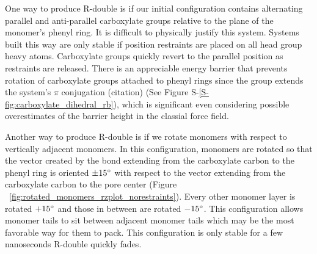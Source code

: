 \documentclass[journal=jpcbfk,manuscript=article]{achemso}
\begin{document}
  One way to produce R-double is if our initial configuration contains
  alternating parallel and anti-parallel carboxylate groups relative to the plane
  of the monomer's phenyl ring.  It is difficult to physically justify this
  system. Systems built this way are only stable if position restraints are
  placed on all head group heavy atoms.  Carboxylate groups quickly revert to the
  parallel position as restraints are released. There is an appreciable energy
  barrier that prevents rotation of carboxylate groups attached to phenyl rings
  since the group extends the system's $\pi$ conjugation (citation) (See Figure
  S-\ref{S-fig:carboxylate_dihedral_rb}), which is significant even considering
  possible overestimates of the barrier height in the classial force field. 
%  

  Another way to produce R-double is if we rotate monomers with respect to
  vertically adjacent monomers. In this configuration, monomers are rotated so
  that the vector created by the bond extending from the carboxylate carbon to
  the phenyl ring is oriented $\pm 15 \degree$ with respect to the vector
  extending from the carboxylate carbon to the pore center (Figure
  ~\ref{fig:rotated_monomers_rzplot_norestraints}). Every other monomer layer is
  rotated $+15 \degree$ and those in between are rotated $-15 \degree$. This
  configuration allows monomer tails to sit between adjacent monomer tails which
  may be the most favorable way for them to pack. This configuration is only
  stable for a few nanoseconds R-double quickly fades. 
  
\end{document}
